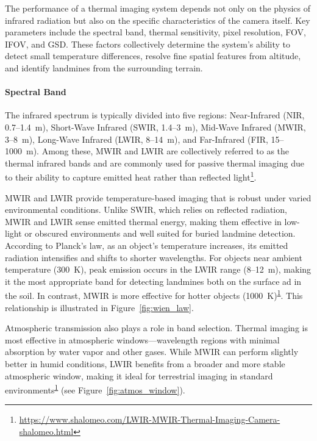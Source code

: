 The performance of a thermal imaging system depends not only on the physics of infrared radiation but also on the specific characteristics of the camera itself. Key parameters include the spectral band, thermal sensitivity, pixel resolution, \gls{FOV}, \gls{IFOV}, and \gls{GSD}. These factors collectively determine the system’s ability to detect small temperature differences, resolve fine spatial features from altitude, and identify landmines from the surrounding terrain.


\paragraph{Spectral Band}

The infrared spectrum is typically divided into five regions: Near-Infrared (NIR, 0.7--1.4~\textmu m), Short-Wave Infrared (SWIR, 1.4–3~\textmu m), Mid-Wave Infrared (MWIR, 3–8~\textmu m), Long-Wave Infrared (\gls{LWIR}, 8–14~\textmu m), and Far-Infrared (FIR, 15–1000~\textmu m). Among these, \gls{MWIR} and \gls{LWIR} are collectively referred to as the thermal infrared bands and are commonly used for passive thermal imaging due to their ability to capture emitted heat rather than reflected light\footnote{\label{LWIR}\url{https://www.shalomeo.com/LWIR-MWIR-Thermal-Imaging-Camera-shalomeo.html}}.

\gls{MWIR} and \gls{LWIR} provide temperature-based imaging that is robust under varied environmental conditions. Unlike \gls{SWIR}, which relies on reflected radiation, \gls{MWIR} and \gls{LWIR} sense emitted thermal energy, making them effective in low-light or obscured environments and well suited for buried landmine detection. According to Planck’s law, as an object’s temperature increases, its emitted radiation intensifies and shifts to shorter wavelengths. For objects near ambient temperature (300~K), peak emission occurs in the \gls{LWIR} range (8–12~\textmu m), making it the most appropriate band for detecting landmines both on the surface ad in the soil. In contrast, \gls{MWIR} is more effective for hotter objects (1000~K)\textsuperscript{\ref{LWIR}}. This relationship is illustrated in Figure~\ref{fig:wien_law}.

Atmospheric transmission also plays a role in band selection. Thermal imaging is most effective in atmospheric windows—wavelength regions with minimal absorption by water vapor and other gases. While \gls{MWIR} can perform slightly better in humid conditions, \gls{LWIR} benefits from a broader and more stable atmospheric window, making it ideal for terrestrial imaging in standard environments\textsuperscript{\ref{LWIR}} (see Figure~\ref{fig:atmos_window}).

